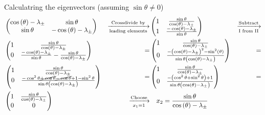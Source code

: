 \documentclass[a4paper,german,12pt,smallheadings]{scrartcl}
\begin{document}
\begin{enumerate}[a)]
    Calculatring the eigenvectors (assuming $\sin\theta \neq 0$)
    \begin{align*}
      &\begin{pmatrix}
        \cos\del\theta - \lambda_\pm & \sin \theta \\
        \sin\theta & -\cos\del\theta - \lambda_\pm \\
      \end{pmatrix}
      &\xrightarrow[\text{leading elements}]{\text{Crossdivide by}}&
      \begin{pmatrix}
        1 & \frac{\sin \theta}{\cos\del\theta-\lambda_\pm} \\
        1 & \frac{-\cos\del\theta - \lambda_\pm}{\sin\theta} \\
      \end{pmatrix}
      &\xrightarrow[\text{I from II}]{\text{Subtract}} \\
      &\begin{pmatrix}
        1 & \frac{\sin \theta}{\cos\del\theta-\lambda_\pm} \\
        0 & \frac{-\cos\del\theta - \lambda_\pm}{\sin\theta} - \frac{\sin \theta}{\cos\del\theta-\lambda_\pm} \\
      \end{pmatrix}
      &=&
      \begin{pmatrix}
        1 & \frac{\sin \theta}{\cos\del\theta-\lambda_\pm} \\
        0 & \frac{-\del{\cos\del\theta - \lambda_\pm}^2 - \sin^2\del\theta}{\sin\theta\del{\cos\del\theta-\lambda_\pm}} \\
      \end{pmatrix}
      &= \\
      &\begin{pmatrix}
        1 & \frac{\sin \theta}{\cos\del\theta-\lambda_\pm} \\
        0 & \frac{-\cos^2\theta\cancel{+\cos\theta}\cancel{-\cos\theta}+1-\sin^2\theta}{\sin\theta\del{\cos\del\theta-\lambda_\pm}} \\
      \end{pmatrix}
      &=&
      \begin{pmatrix}
        1 & \frac{\sin \theta}{\cos\del\theta-\lambda_\pm} \\
        0 & \frac{-\del{\cos^2\theta+\sin^2\theta}+1}{\sin\theta\del{\cos\del\theta-\lambda_\pm}} \\
      \end{pmatrix}
      &= \\
      &\begin{pmatrix}
        1 & \frac{\sin \theta}{\cos\del\theta-\lambda_\pm} \\
        0 & 0 \\
      \end{pmatrix}
      &\xrightarrow[x_1 = 1]{\text{Choose}}&
      \quad x_2 = \frac{\sin\theta}{\cos\del\theta - \lambda_\pm}
    \end{align*}


\end{enumerate}
\end{document}
